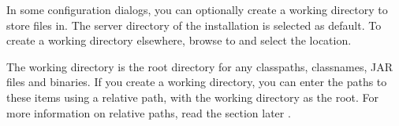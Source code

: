 
In some \gdaut{} configuration dialogs, you can optionally create a working directory to store files in. The server directory of the installation is selected as default. To create a working directory elsewhere, browse to and select the location. 

The working directory is the root directory for any classpaths, classnames, JAR files and binaries. If you create a working directory, you can enter the paths to these items using a relative path, with the working directory as the root. For more information on relative paths, read the section later . 
